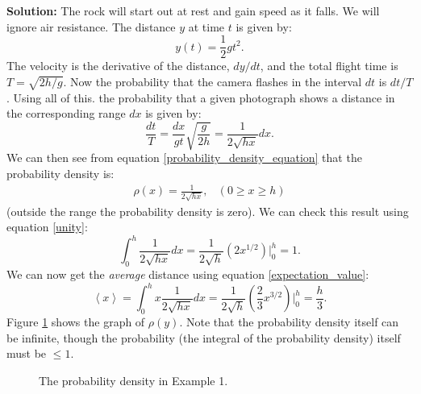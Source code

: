 \documentclass{article}
\begin{document}
\textbf{Solution:}
The rock will start out at rest and gain speed as it falls. We will ignore air resistance. The distance $y$ at time $t$ is given by:
\begin{equation}
y(t) = \frac{1}{2}gt^{2}.
\end{equation}
The velocity is the derivative of the distance, $dy/dt$, and the total flight time is $T = \sqrt{2h/g}$. Now the probability that the camera flashes in the interval $dt$ is $dt/T$. Using all of this. the probability that a given photograph shows a distance in the corresponding range $dx$ is given by:
\begin{equation}
\frac{dt}{T} = \frac{dx}{gt}\sqrt{\frac{g}{2h}} = \frac{1}{2\sqrt{hx}}dx.
\end{equation}
We can then see from equation \ref{probability_density_equation} that the probability density is:
\begin{eqnarray}
\rho (x) = \frac{1}{2\sqrt{hx}}, & (0 \geq x \geq h)
\end{eqnarray}
(outside the range the probability density is zero). We can check this result using equation \ref{unity}:
\begin{equation}
\int_{0}^{h} \frac{1}{2\sqrt{hx}}dx = \frac{1}{2\sqrt{h}} \left( 2x^{1/2} \right) \Big|^{h}_{0} = 1.
\end{equation}
We can now get the \emph{average} distance using equation \ref{expectation_value}:
\begin{equation}
\left< x \right> = \int_{0}^{h} x \frac{1}{2\sqrt{hx}}dx = \frac{1}{2\sqrt{h}}\left( \frac{2}{3} x^{3/2} \right) \Big|^{h}_{0} = \frac{h}{3}.
\end{equation}
Figure \ref{3} shows the graph of $\rho (y)$. Note that the probability density itself can be infinite, though the probability (the integral of the probability density) itself must be $ \leq 1$.
\begin{figure}[h]
\caption{The probability density in Example 1.}
\label{3}
\end{figure}
\end{document}
